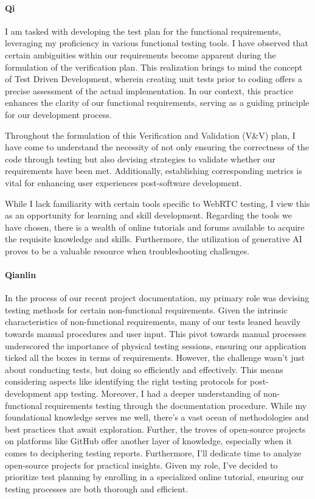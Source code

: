 \documentclass[12pt, titlepage]{article}
\begin{document}
\paragraph*{Qi}

I am tasked with developing the test plan for the functional requirements,
leveraging my proficiency in various functional testing tools. I have observed
that certain ambiguities within our requirements become apparent during the
formulation of the verification plan. This realization brings to mind the
concept of Test Driven Development, wherein creating unit tests prior to coding
offers a precise assessment of the actual implementation. In our context, this
practice enhances the clarity of our functional requirements, serving as a
guiding principle for our development process.

Throughout the formulation of this Verification and Validation (V\&V) plan, I
have come to understand the necessity of not only ensuring the correctness of
the code through testing but also devising strategies to validate whether our
requirements have been met. Additionally, establishing corresponding metrics is
vital for enhancing user experiences post-software development.

While I lack familiarity with certain tools specific to WebRTC testing, I view
this as an opportunity for learning and skill development. Regarding the tools
we have chosen, there is a wealth of online tutorials and forums available to
acquire the requisite knowledge and skills. Furthermore, the utilization of
generative AI proves to be a valuable resource when troubleshooting challenges.

\paragraph*{Qianlin}

In the process of our recent project documentation, my primary role was devising
testing methods for certain non-functional requirements. Given the intrinsic
characteristics of non-functional requirements, many of our tests leaned heavily
towards manual procedures and user input. This pivot towards manual processes
underscored the importance of physical testing sessions, ensuring our
application ticked all the boxes in terms of requirements. However, the
challenge wasn't just about conducting tests, but doing so efficiently and
effectively. This means considering aspects like identifying the right testing
protocols for post-development app testing. Moreover, I had a deeper
understanding of non-functional requirements testing through the documentation
procedure. While my foundational knowledge serves me well, there's a vast ocean
of methodologies and best practices that await exploration. Further, the troves
of open-source projects on platforms like GitHub offer another layer of
knowledge, especially when it comes to deciphering testing reports. Furthermore,
I'll dedicate time to analyze open-source projects for practical insights. Given
my role, I've decided to prioritize test planning by enrolling in a specialized
online tutorial, ensuring our testing processes are both thorough and efficient.
\end{document}
